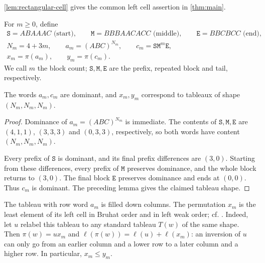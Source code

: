 \documentclass[a4paper,11pt]{amsart}
\newcommand{\word}[1]{#1}
\newcommand{\wordstart}{\mathtt{S}}
\newcommand{\wordmiddle}{\mathtt{M}}
\newcommand{\wordend}{\mathtt{E}}
\numberwithin{equation}{subsection}
\theoremstyle{plain}
\theoremstyle{definition}
\theoremstyle{remark}
\begin{document}
\autoref{lem:rectangular-cell} gives the common left cell assertion
in \autoref{thm:main}.

\begin{definition}\label{D:words}
For $m\ge0$, define
\begin{equation}\label{eq:words}
\begin{gathered}
\wordstart=\word{ABAAAC}\text{ (start)},\qquad \wordmiddle=\word{BBBAACACC}\text{ (middle)},\qquad \wordend=\word{BBCBCC}\text{ (end)},\\
N_m=4+3m,\qquad a_m=(ABC)^{N_m},\qquad c_m=\wordstart\wordmiddle^m\wordend,\\
x_m=\pi(a_m),\qquad y_m=\pi(c_m).
\end{gathered}
\end{equation}
We call $m$ the block count; $\wordstart,\wordmiddle,\wordend$ are the prefix,
repeated block and tail, respectively.
\end{definition}

\begin{lemma}
The words $a_m,c_m$ are dominant, and $x_m,y_m$ correspond to
tableaux of shape $(N_m,N_m,N_m)$.
\end{lemma}

\begin{proof}
Dominance of $a_m=(ABC)^{N_m}$ is immediate.
The contents of $\wordstart,\wordmiddle,\wordend$ are $(4,1,1)$, $(3,3,3)$ and $(0,3,3)$,
respectively, so both words have content $(N_m,N_m,N_m)$.

Every prefix of $\wordstart$ is dominant, and its final prefix differences
are $(3,0)$. Starting from these differences, every prefix of $\wordmiddle$
preserves dominance, and the whole block returns to $(3,0)$.
The final block $\wordend$ preserves dominance and ends at $(0,0)$.
Thus $c_m$ is dominant. The preceding lemma gives the claimed
tableau shape.
\end{proof}

\begin{remark}\label{rem:minimal-cell}
The tableau with row word $a_m$ is filled down columns. The permutation
$x_m$ is the least element of its left cell in Bruhat order and in left
weak order; cf. \cite[Remark 6.21]{Nguyen}. Indeed, let $u$ relabel this
tableau to any standard tableau $T(w)$ of the same shape. Then
$\pi(w)=ux_m$ and $\ell(\pi(w))=\ell(u)+\ell(x_m)$: an inversion of $u$
can only go from an earlier column and a lower row to a later column
and a higher row. In particular, $x_m\le y_m$.
\end{remark}
\end{document}
